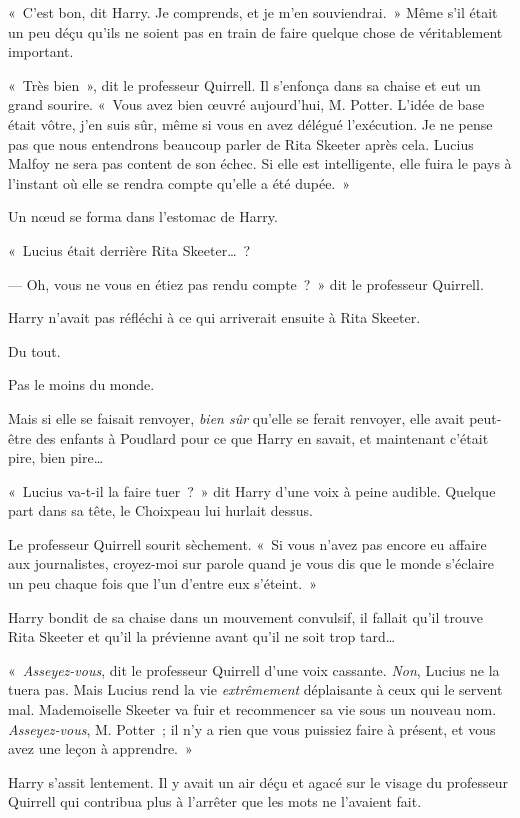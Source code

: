 «~C'est bon, dit Harry. Je comprends, et je m'en souviendrai.~» Même s'il était un peu déçu qu'ils ne soient pas en train de faire quelque chose de véritablement important.

«~Très bien~», dit le professeur Quirrell. Il s'enfonça dans sa chaise et eut un grand sourire. «~Vous avez bien œuvré aujourd'hui, M. Potter. L'idée de base était vôtre, j'en suis sûr, même si vous en avez délégué l'exécution. Je ne pense pas que nous entendrons beaucoup parler de Rita Skeeter après cela. Lucius Malfoy ne sera pas content de son échec. Si elle est intelligente, elle fuira le pays à l'instant où elle se rendra compte qu'elle a été dupée.~»

Un nœud se forma dans l'estomac de Harry.

«~Lucius était derrière Rita Skeeter…~?

--- Oh, vous ne vous en étiez pas rendu compte~?~» dit le professeur Quirrell.

Harry n'avait pas réfléchi à ce qui arriverait ensuite à Rita Skeeter.

Du tout.

Pas le moins du monde.

Mais si elle se faisait renvoyer, \emph{bien sûr} qu'elle se ferait renvoyer, elle avait peut-être des enfants à Poudlard pour ce que Harry en savait, et maintenant c'était pire, bien pire…

«~Lucius va-t-il la faire tuer~?~» dit Harry d'une voix à peine audible. Quelque part dans sa tête, le Choixpeau lui hurlait dessus.

Le professeur Quirrell sourit sèchement. «~Si vous n'avez pas encore eu affaire aux journalistes, croyez-moi sur parole quand je vous dis que le monde s'éclaire un peu chaque fois que l'un d'entre eux s'éteint.~»

Harry bondit de sa chaise dans un mouvement convulsif, il fallait qu'il trouve Rita Skeeter et qu'il la prévienne avant qu'il ne soit trop tard…

«~\emph{Asseyez-vous}, dit le professeur Quirrell d'une voix cassante. \emph{Non}, Lucius ne la tuera pas. Mais Lucius rend la vie \emph{extrêmement} déplaisante à ceux qui le servent mal. Mademoiselle Skeeter va fuir et recommencer sa vie sous un nouveau nom. \emph{Asseyez-vous}, M. Potter~; il n'y a rien que vous puissiez faire à présent, et vous avez une leçon à apprendre.~»

Harry s'assit lentement. Il y avait un air déçu et agacé sur le visage du professeur Quirrell qui contribua plus à l'arrêter que les mots ne l'avaient fait.

